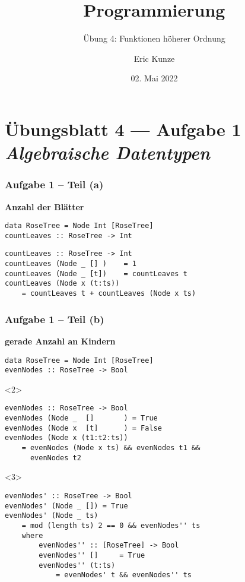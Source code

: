 \documentclass{beamer}
\begin{document}
	
	\title{Programmierung}
	\subtitle{Übung 4: Funktionen höherer Ordnung}
	\author{Eric Kunze}
	\date{02. Mai 2022}
	
	\maketitle
	


\section{Übungsblatt 4 --- Aufgabe 1 \\ \textit{\normalsize Algebraische Datentypen}}

\begin{frame}[t, fragile] \frametitle{Aufgabe 1 -- Teil (a)}
	\textbf{Anzahl der Blätter}
	
	\begin{lstlisting}[style=bg]
data RoseTree = Node Int [RoseTree]
countLeaves :: RoseTree -> Int
	\end{lstlisting}
	
	
	\pause \bigskip
	
	\begin{lstlisting}[style=bg]
countLeaves :: RoseTree -> Int
countLeaves (Node _ [] )    = 1
countLeaves (Node _ [t])    = countLeaves t
countLeaves (Node x (t:ts)) 
	= countLeaves t + countLeaves (Node x ts)
	\end{lstlisting}
\end{frame}

\begin{frame}[t, fragile] \frametitle{Aufgabe 1 -- Teil (b)}
	\textbf{gerade Anzahl an Kindern}
	
	\begin{lstlisting}[style=bg]
data RoseTree = Node Int [RoseTree]
evenNodes :: RoseTree -> Bool
	\end{lstlisting}
	
	
	\pause \bigskip
	\begin{onlyenv}
		\begin{lstlisting}[style=bg]
evenNodes :: RoseTree -> Bool
evenNodes (Node _  []       ) = True
evenNodes (Node x  [t]      ) = False
evenNodes (Node x (t1:t2:ts)) 
	= evenNodes (Node x ts) && evenNodes t1 && 
	  evenNodes t2
		\end{lstlisting}
	\end{onlyenv}

	\begin{onlyenv}
		\begin{lstlisting}[style=bg]
evenNodes' :: RoseTree -> Bool
evenNodes' (Node _ []) = True
evenNodes' (Node _ ts)
	= mod (length ts) 2 == 0 && evenNodes'' ts
	where
		evenNodes'' :: [RoseTree] -> Bool
		evenNodes'' []     = True
		evenNodes'' (t:ts) 
			= evenNodes' t && evenNodes'' ts
		\end{lstlisting}
	\end{onlyenv}
\end{frame}
\end{document}
